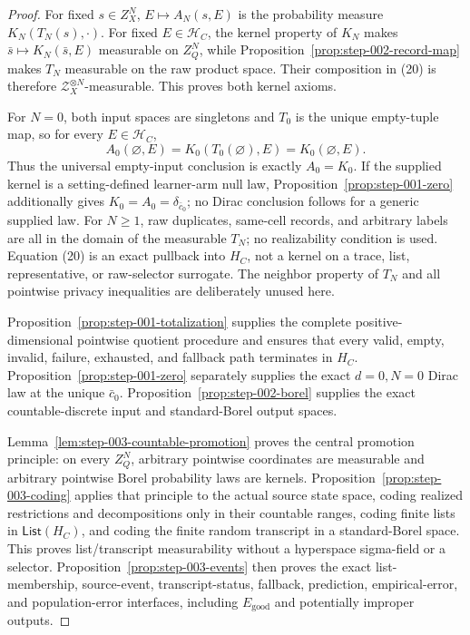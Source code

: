 \begin{proof}
For fixed \(s\in Z_X^N\), \(E\mapsto A_N(s,E)\) is the
probability measure \(K_N(T_N(s),\cdot)\). For fixed
\(E\in\mathcal H_C\), the kernel property of \(K_N\) makes
\(\bar s\mapsto K_N(\bar s,E)\) measurable on \(Z_Q^N\), while Proposition~\ref{prop:step-002-record-map} makes \(T_N\) measurable on the
raw product space. Their composition in (20) is therefore
\(\mathcal Z_X^{\otimes N}\)-measurable. This proves both kernel axioms.

For \(N=0\), both input spaces are singletons and \(T_0\) is the unique
empty-tuple map, so for every \(E\in\mathcal H_C\),
\[
A_0(\varnothing,E)=K_0(T_0(\varnothing),E)=K_0(\varnothing,E).
\tag{22}
\]
Thus the universal empty-input conclusion is exactly \(A_0=K_0\).
If the supplied kernel is a setting-defined learner-arm null law,
Proposition~\ref{prop:step-001-zero} additionally gives
\(K_0=A_0=\delta_{\bar c_0}\); no Dirac conclusion follows for a generic
supplied law. For \(N\ge1\), raw duplicates, same-cell records, and arbitrary labels are all
in the domain of the measurable \(T_N\); no realizability condition is used.
Equation (20) is an exact pullback into \(H_C\), not a kernel on a trace,
list, representative, or raw-selector surrogate. The  neighbor
property of \(T_N\) and all pointwise privacy inequalities are deliberately
unused here.

Proposition~\ref{prop:step-001-totalization} supplies the complete
positive-dimensional pointwise quotient procedure and ensures that every
valid, empty, invalid, failure, exhausted, and fallback path terminates in
\(H_C\). Proposition~\ref{prop:step-001-zero} separately supplies
the exact \(d=0,N=0\) Dirac law at the unique \(\bar c_0\). Proposition~\ref{prop:step-002-borel} supplies the exact countable-discrete
input and standard-Borel output spaces.

Lemma~\ref{lem:step-003-countable-promotion} proves the central promotion
principle: on every \(Z_Q^N\), arbitrary pointwise coordinates are
measurable and arbitrary pointwise Borel probability laws are kernels.
Proposition~\ref{prop:step-003-coding} applies that principle to the actual
source state space, coding realized restrictions and decompositions only in
their countable ranges, coding finite lists in
\(\mathsf{List}(H_C)\), and coding the finite random transcript in a
standard-Borel space. This proves list/transcript measurability without a
hyperspace sigma-field or a selector.
Proposition~\ref{prop:step-003-events} then proves the exact list-membership,
source-event, transcript-status, fallback, prediction, empirical-error, and
population-error interfaces, including \(E_{\mathrm{good}}\) and
potentially improper outputs.


\end{proof}
